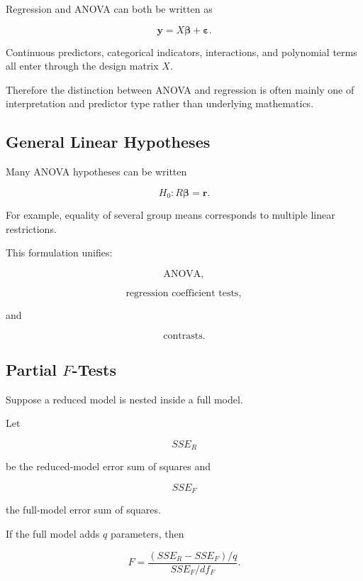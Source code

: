 Regression and ANOVA can both be written as

\[
\boxed{
\mathbf{y}
=
X\boldsymbol{\beta}
+
\boldsymbol{\varepsilon}.
}
\]

Continuous predictors, categorical indicators, interactions, and
polynomial terms all enter through the design matrix \(X\).

Therefore the distinction between ANOVA and regression is often mainly
one of interpretation and predictor type rather than underlying
mathematics.

\subsection{General Linear Hypotheses}
\label{subsec:anova-general-linear-hypotheses}

Many ANOVA hypotheses can be written

\[
\boxed{
H_0:
R\boldsymbol{\beta}
=
\mathbf{r}.
}
\]

For example, equality of several group means corresponds to multiple
linear restrictions.

This formulation unifies:

\[
\boxed{
\text{ANOVA},
}
\]

\[
\boxed{
\text{regression coefficient tests},
}
\]

and

\[
\boxed{
\text{contrasts}.
}
\]

\subsection{Partial \(F\)-Tests}
\label{subsec:partial-f-tests-anova}

Suppose a reduced model is nested inside a full model.

Let

\[
SSE_R
\]

be the reduced-model error sum of squares and

\[
SSE_F
\]

the full-model error sum of squares.

If the full model adds \(q\) parameters, then

\[
\boxed{
F
=
\frac{
(SSE_R-SSE_F)/q
}{
SSE_F/df_F
}.
}
\]

